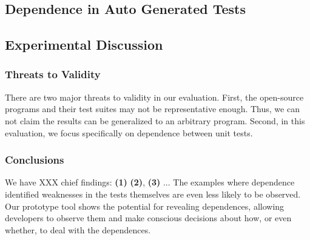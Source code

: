 


\subsection{Dependence in Auto Generated Tests}
\label{sec:autogen}



\subsection{Experimental Discussion}

\subsubsection{Threats to Validity}

There are two major threats to validity in our evaluation.
First, the  open-source
programs and their test suites may not be
representative enough. Thus, we can not claim the results
can be generalized to an arbitrary program.
Second, in this evaluation, we focus specifically on
dependence between unit tests.

\subsubsection{Conclusions}


We have XXX chief findings: \textbf{(1)}
\textbf{(2)}, \textbf{(3)} ...
The examples where dependence identified weaknesses in the tests themselves
are even less likely to be observed.  
Our prototype tool shows
the potential for revealing dependences, allowing
developers to observe them and make conscious decisions about how, or even whether,
to deal with the dependences. 
